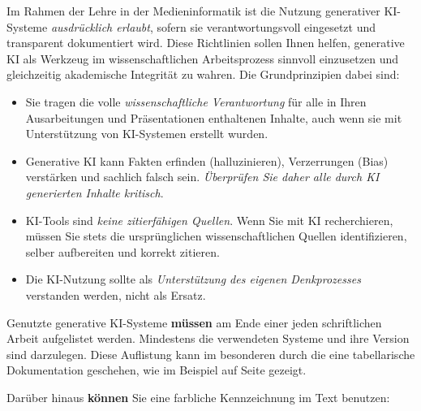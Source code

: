 \documentclass[12pt,        %
  english,ngerman,          %
  paper=a4,                 %
  captions=tablesignature,  %
  listof=numbered,          %
  bibliography=totoc,       %
  headings=small,           %
  headinclude=false,        %
  footinclude=false,        %
  parskip=half-,            %
  oneside,                  %
  BCOR=5mm,                 %
  DIV=12                    %
  ]{scrbook}                %
\begin{document}
Im Rahmen der Lehre in der Medieninformatik ist die Nutzung generativer KI-Systeme \textit{ausdrücklich erlaubt}, sofern sie verantwortungsvoll eingesetzt und transparent dokumentiert wird. Diese Richtlinien sollen Ihnen helfen, generative KI als Werkzeug im wissenschaftlichen Arbeitsprozess sinnvoll einzusetzen und gleichzeitig akademische Integrität zu wahren. Die Grundprinzipien dabei sind:
    
\begin{itemize}
  \item Sie tragen die volle \textit{wissenschaftliche Verantwortung} für alle in Ihren Ausarbeitungen und Präsentationen enthaltenen Inhalte, auch wenn sie mit Unterstützung von KI-Systemen erstellt wurden.
  \item Generative KI kann Fakten erfinden (halluzinieren), Verzerrungen (Bias) verstärken und sachlich falsch sein. \textit{Überprüfen Sie daher alle durch KI generierten Inhalte kritisch}.    
  \item KI-Tools sind \textit{keine zitierfähigen Quellen}. Wenn Sie mit KI recherchieren, müssen Sie stets die ursprünglichen wissenschaftlichen Quellen identifizieren, selber aufbereiten und korrekt zitieren.
  \item Die KI-Nutzung sollte als \textit{Unterstützung des eigenen Denkprozesses} verstanden werden, nicht als Ersatz.
\end{itemize}

Genutzte generative KI-Systeme \textbf{müssen} am Ende einer jeden schriftlichen Arbeit aufgelistet werden. Mindestens die verwendeten Systeme und ihre Version sind darzulegen. Diese Auflistung kann im besonderen durch die eine tabellarische Dokumentation geschehen, wie im Beispiel auf Seite \pageref{sec:ai_use} gezeigt.

 
Darüber hinaus \textbf{können} Sie eine farbliche Kennzeichnung im Text benutzen:
  

  
\end{document}
